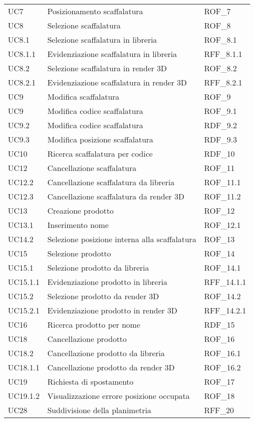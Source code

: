 \begin{xltabular}{\textwidth}{ p{0.3\textwidth} | X | p{0.2\textwidth} }
    UC7 & Posizionamento scaffalatura & ROF\_7\\
    UC8 & Selezione scaffalatura & ROF\_8\\
    UC8.1 & Selezione scaffalatura in libreria & ROF\_8.1\\
    UC8.1.1 & Evidenziazione scaffalatura in libreria & RFF\_8.1.1\\
    UC8.2 & Selezione scaffalatura in render 3D & ROF\_8.2\\
    UC8.2.1 & Evidenziazione scaffalatura in render 3D & RFF\_8.2.1\\
    UC9 & Modifica scaffalatura & ROF\_9\\
    UC9 & Modifica codice scaffalatura & ROF\_9.1\\
    UC9.2 & Modifica codice scaffalatura & RDF\_9.2\\
    UC9.3 & Modifica posizione scaffalatura & RDF\_9.3\\
    UC10 & Ricerca scaffalatura per codice & RDF\_10\\
    UC12 & Cancellazione scaffalatura & ROF\_11\\
    UC12.2 & Cancellazione scaffalatura da libreria & ROF\_11.1\\
    UC12.3 & Cancellazione scaffalatura da render 3D & ROF\_11.2\\
    UC13 & Creazione prodotto & ROF\_12\\
    UC13.1 & Inserimento nome & ROF\_12.1\\
    UC14.2 & Selezione posizione interna alla scaffalatura & ROF\_13\\
    UC15 & Selezione prodotto & ROF\_14\\
    UC15.1 & Selezione prodotto da libreria & ROF\_14.1\\
    UC15.1.1 & Evidenziazione prodotto in libreria & RFF\_14.1.1\\
    UC15.2 & Selezione prodotto da render 3D & ROF\_14.2\\
    UC15.2.1 & Evidenziazione prodotto in render 3D & RFF\_14.2.1\\
    UC16 & Ricerca prodotto per nome & RDF\_15\\
    UC18 & Cancellazione prodotto & ROF\_16\\
    UC18.2 & Cancellazione prodotto da libreria & ROF\_16.1\\
    UC18.1.1 & Cancellazione prodotto da render 3D & ROF\_16.2\\
    UC19 & Richiesta di spostamento & ROF\_17\\
    UC19.1.2 & Visualizzazione errore posizione occupata & ROF\_18\\
    UC28 & Suddivisione della planimetria & RFF\_20\\
    \hline
\end{xltabular}

